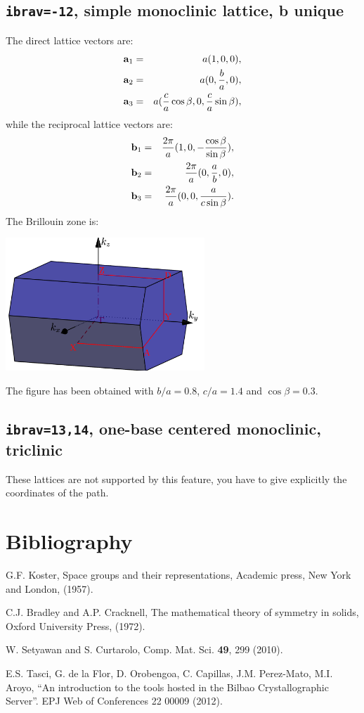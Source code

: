 \documentclass[12pt,a4paper]{article}
\begin{document}
\subsection{\texttt{ibrav=-12}, simple monoclinic lattice, b unique}
The direct lattice vectors are:
\begin{eqnarray}
{\bf a}_1 &=& a (1, 0, 0), \nonumber \\
{\bf a}_2 &=& a (0, {b \over a}, 0), \nonumber \\
{\bf a}_3 &=& a ({c \over a} \cos{\beta}, 0, {c \over a}\sin{\beta}), \nonumber 
\end{eqnarray}
while the reciprocal lattice vectors are:
\begin{eqnarray}
{\bf b}_1 &=& {2\pi \over a} (1, 0, -{\cos{\beta}\over \sin{\beta}}), \nonumber \\
{\bf b}_2 &=& {2\pi \over a} (0, {a \over b}, 0), \nonumber \\
{\bf b}_3 &=& {2\pi \over a} (0, 0, {a \over c \sin{\beta}}). \nonumber
\end{eqnarray}
The Brillouin zone is: 
\begin{center}
\includegraphics[width=7.5cm,angle=0]{images/monob.png} 
\end{center}
The figure has been obtained with $b/a=0.8$, $c/a=1.4$ and $\cos{\beta}=0.3$.


\subsection{\texttt{ibrav=13,14}, one-base centered monoclinic,
triclinic}
These lattices are not supported by this feature, you have to give
explicitly the coordinates of the path.

\section{Bibliography}

\noindent [1] G.F. Koster, Space groups and their representations, Academic press,
New York and London, (1957). 

\noindent [2] C.J. Bradley and A.P. Cracknell, The mathematical theory of symmetry
in solids, Oxford University Press, (1972).

\noindent [3] W. Setyawan and S. Curtarolo, Comp. Mat. Sci.  {\bf 49}, 299 (2010).

\noindent [4] E.S. Tasci, G. de la Flor, D. Orobengoa, C. Capillas, 
J.M. Perez-Mato, M.I. Aroyo, ``An introduction to the tools hosted in the 
Bilbao Crystallographic Server''. EPJ Web of Conferences 22 00009 (2012).
\end{document}

